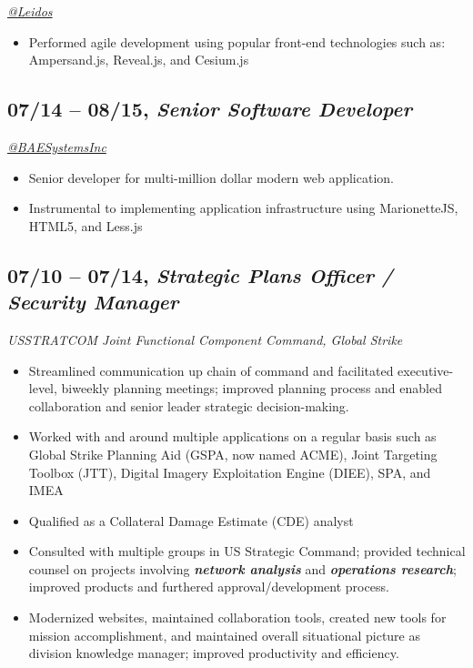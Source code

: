\documentclass[10pt]{article}
\def\tightlist{}
\begin{document}
\emph{\href{https://twitter.com/LeidosInc}{@Leidos}}

\begin{itemize}
\tightlist
\item
  Performed agile development using popular front-end technologies such
  as: Ampersand.js, Reveal.js, and Cesium.js
\end{itemize}

\subsection{\texorpdfstring{07/14 -- 08/15, \textbf{\emph{Senior
Software
Developer}}}{07/14 -- 08/15, Senior Software Developer}}\label{senior-software-developer-1}

\emph{\href{https://twitter.com/BAESystemsInc}{@BAESystemsInc}}

\begin{itemize}
\tightlist
\item
  Senior developer for multi-million dollar modern web application.
\item
  Instrumental to implementing application infrastructure using
  MarionetteJS, HTML5, and Less.js
\end{itemize}

\subsection{\texorpdfstring{07/10 -- 07/14, \textbf{\emph{Strategic
Plans Officer / Security
Manager}}}{07/10 -- 07/14, Strategic Plans Officer / Security Manager}}\label{strategic-plans-officer-security-manager}

\emph{USSTRATCOM Joint Functional Component Command, Global Strike}

\begin{itemize}
\tightlist
\item
  Streamlined communication up chain of command and facilitated
  executive-level, biweekly planning meetings; improved planning process
  and enabled collaboration and senior leader strategic decision-making.
\item
  Worked with and around multiple applications on a regular basis such
  as Global Strike Planning Aid (GSPA, now named ACME), Joint Targeting
  Toolbox (JTT), Digital Imagery Exploitation Engine (DIEE), SPA, and
  IMEA
\item
  Qualified as a Collateral Damage Estimate (CDE) analyst
\item
  Consulted with multiple groups in US Strategic Command; provided
  technical counsel on projects involving \textbf{\emph{network
  analysis}} and \textbf{\emph{operations research}}; improved products
  and furthered approval/development process.
\item
  Modernized websites, maintained collaboration tools, created new tools
  for mission accomplishment, and maintained overall situational picture
  as division knowledge manager; improved productivity and efficiency.
\end{itemize}
\end{document}
